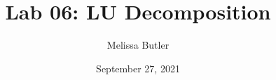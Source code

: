 \newcommand{\course}{MATH 3341}
\title{Lab 06: LU Decomposition}
\author{Melissa Butler}
\date{September 27, 2021}
